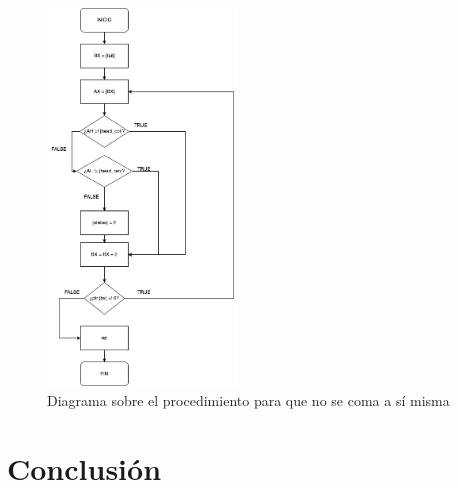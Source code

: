 \documentclass[12pt]{article}
\begin{document}
\begin{figure}
    \centering
    \includegraphics[height= 10cm]{img/diagramas/07DiagramaAutoComer.jpg}
    \caption{Diagrama sobre el procedimiento para que no se coma a sí misma}
    \label{fig:auto}
\end{figure}

\section*{Conclusión}
\end{document}
